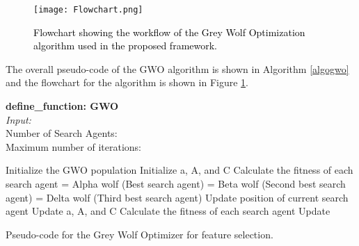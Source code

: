 \documentclass{llncs}
\begin{document}
\begin{figure}
    \centering
    \texttt{[image: Flowchart.png]}
    \caption{\textcolor{black}{Flowchart showing the workflow of the Grey Wolf Optimization algorithm used in the proposed framework.}}
    \label{flowchart}
\end{figure}

The overall pseudo-code of the GWO algorithm is shown in Algorithm \ref{algogwo} and the flowchart for the algorithm is shown in Figure \ref{flowchart}.
\begin{algorithm}[h]
    {\small
    \textbf{define\_function: GWO}\\
    {\em Input:}\\
    Number of Search Agents: \\
    Maximum number of iterations: 
    \begin{algorithmic}[]
    \STATE Initialize the GWO population 
    \STATE Initialize a, A, and C 
    \STATE Calculate the fitness of each search agent
    \STATE  = Alpha wolf (Best search agent)
    \STATE  = Beta wolf (Second best search agent)
    \STATE  = Delta wolf (Third best search agent)
        \STATE{}
            \STATE{}
                \STATE Update position of current search agent 
            \ENDFOR
            \STATE Update a, A, and C
            \STATE Calculate the fitness of each search agent
            \STATE Update  
            \STATE 
        \ENDWHILE
    \end{algorithmic}
    
    \caption{Pseudo-code for the Grey Wolf Optimizer for feature selection.}
    \label{algogwo}
    }
\end{algorithm}
\end{document}
